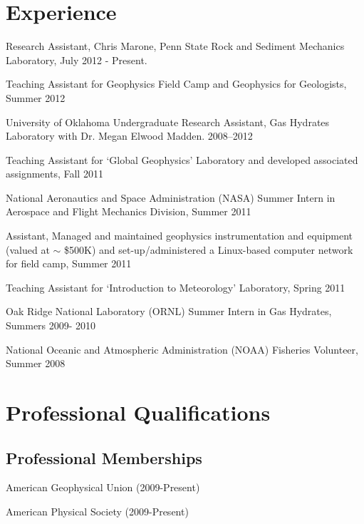 \documentclass[letterpaper]{article}
\renewenvironment{itemize}{
  \begin{list}{}{
    \setlength{\leftmargin}{1.5em}
  }
}{
  \end{list}
}
\begin{document}
\section*{Experience}

\begin{itemize}
\item Research Assistant, Chris Marone, Penn State Rock and Sediment Mechanics Laboratory, July 2012 - Present.
\item Teaching Assistant for Geophysics Field Camp and Geophysics for Geologists, Summer 2012
\item University of Oklahoma Undergraduate Research Assistant, Gas Hydrates Laboratory with Dr. Megan Elwood Madden. 2008--2012
\item Teaching Assistant for `Global Geophysics' Laboratory and developed associated assignments, Fall 2011
\item National Aeronautics and Space Administration (NASA) Summer Intern in Aerospace and Flight Mechanics Division, Summer 2011
\item Assistant, Managed and maintained geophysics instrumentation and equipment (valued at $\sim$ \$500K) and set-up/administered a Linux-based computer network for field camp, Summer 2011
\item Teaching Assistant for `Introduction to Meteorology' Laboratory, Spring 2011
\item Oak Ridge National Laboratory (ORNL) Summer Intern in Gas Hydrates, Summers 2009- 2010
\item National Oceanic and Atmospheric Administration (NOAA) Fisheries Volunteer, Summer 2008
\end{itemize}

\section*{Professional Qualifications}

\subsection*{Professional Memberships}
\begin{itemize}
\item American Geophysical Union (2009-Present)
\item American Physical Society      (2009-Present)
\end{itemize}
\end{document}
